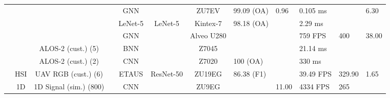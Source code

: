\begin{landscape}
\begin{longtable}{ c c c c c c c M{1.7cm} M{1.05cm} M{1.3cm} M{1.3cm} M{0.8cm} }
 & & & \cite{zhangAccurateLowlatencyEfficient2022a} & GNN &  & ZU7EV & 99.09 (OA) & 0.96 & 0.105 ms &  & 6.30 \\
 & & & \cite{chenHardwareImplementationConvolutional2020} & LeNet-5 & LeNet-5 & Kintex-7 & 98.18 (OA) &  & 2.29 ms &  &  \\
 & & & \cite{zhangAcceleratingGNNbasedSAR2023} & GNN &  & Alveo U280 &  &  & 759 FPS & 400 & 38.00 \\
 & & ALOS-2 (cust.) (5) & \cite{myojinDetectingUncertainBNN2020} & BNN &  & Z7045 &  &  & 21.14 ms &  &  \\
 & & ALOS-2 (cust.) (2) & \cite{hashimotoShipClassificationSAR2019a} & CNN &  & Z7020 & 100 (OA) &  & 330 ms &  &  \\
 & HSI & UAV RGB (cust.) (6) & \cite{huangEdgeTrustworthyAI2024} & ETAUS & ResNet-50 & ZU19EG & 86.38 (F1) &  & 39.49 FPS & 329.90 & 1.65 \\
 & 1D & 1D Signal (sim.) (800) & \cite{pitsisEfficientConvolutionalNeural2019a} & CNN &  & ZU9EG &  & 11.00 & 4334 FPS & 265 &  \\
 \midrule
 

\end{longtable}
\end{landscape}
